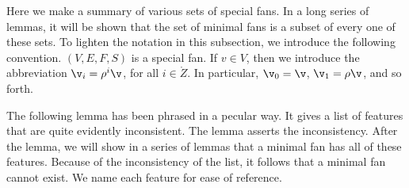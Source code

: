 Here we make a summary of various sets of special fans. In a long
series of lemmas, it will be shown that the set of minimal fans is a
subset of every one of these sets.  To lighten the notation in this
subsection, we introduce the following convention.  $(V,E,F,S)$ is a
special fan.  If $v\in V$, then we introduce the abbreviation $\v_i =
\rho^i\v$, for all $i\in\ring{Z}$.  In particular, $\v_0=\v$,
$\v_1=\rho\v$, and so forth.

The following lemma has been phrased in a pecular way.  It gives a
list of features that are quite evidently inconsistent.  The lemma
asserts the inconsistency.  After the lemma, we will show in a series
of lemmas that a minimal fan has all of these features.  Because of
the inconsistency of the list, it follows that a minimal fan cannot
exist.  We name each feature for ease of reference.


